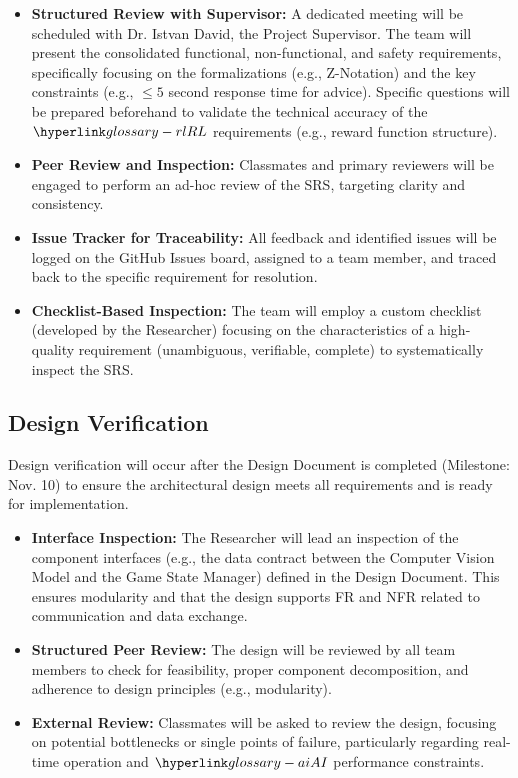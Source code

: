 \documentclass[12pt, titlepage]{article}
\begin{document}
\begin{itemize}
    \item \textbf{Structured Review with Supervisor:} A dedicated meeting will be scheduled with Dr. Istvan David, the Project Supervisor.
    The team will present the consolidated functional, non-functional, and safety requirements, specifically focusing on the formalizations (e.g., Z-Notation) and the key constraints (e.g., $\leq 5$ second response time for advice).
    Specific questions will be prepared beforehand to validate the technical accuracy of the $\RL{}$ requirements (e.g., reward function structure).
    \item \textbf{Peer Review and Inspection:} Classmates and primary reviewers will be engaged to perform an ad-hoc review of the SRS, targeting clarity and consistency.
    \item \textbf{Issue Tracker for Traceability:} All feedback and identified issues will be logged on the GitHub Issues board, assigned to a team member, and traced back to the specific requirement for resolution.
    \item \textbf{Checklist-Based Inspection:} The team will employ a custom checklist (developed by the Researcher) focusing on the characteristics of a high-quality requirement (unambiguous, verifiable, complete) to systematically inspect the SRS.
\end{itemize}



\subsection{Design Verification}





Design verification will occur after the Design Document is completed (Milestone: Nov. 10) to ensure the architectural design meets all requirements and is ready for implementation.

\begin{itemize}
    \item \textbf{Interface Inspection:} The Researcher will lead an inspection of the component interfaces (e.g., the data contract between the Computer Vision Model and the Game State Manager) defined in the Design Document.
    This ensures modularity and that the design supports FR and NFR related to communication and data exchange.
    \item \textbf{Structured Peer Review:} The design will be reviewed by all team members to check for feasibility, proper component decomposition, and adherence to design principles (e.g., modularity).
    \item \textbf{External Review:} Classmates will be asked to review the design, focusing on potential bottlenecks or single points of failure, particularly regarding real-time operation and $\AI{}$ performance constraints.
\end{itemize}
\end{document}
